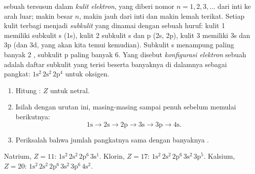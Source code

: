 \begin{definition}\label{def:g10:electron-shells:configuration}
 sebuah  tersusun dalam
\emph{kulit elektron}, yang diberi nomor
$n = 1, 2, 3, \ldots$ dari inti ke arah luar; makin besar $n$, makin
jauh dari inti dan makin lemah  terikat. Setiap kulit
terbagi menjadi \emph{subkulit} yang dinamai dengan
sebuah huruf: kulit 1 memiliki subkulit s (1s), kulit 2 subkulit s dan
p (2s, 2p), kulit 3 memiliki 3s dan 3p (dan 3d, yang akan kita temui
kemudian). Subkulit s menampung paling banyak 2 , subkulit p
paling banyak 6. Yang disebut
\emph{konfigurasi elektron} sebuah 
adalah daftar subkulit yang terisi beserta banyaknya  di
dalamnya sebagai pangkat: $1\mathrm{s}^2\,2\mathrm{s}^2\,2\mathrm{p}^4$
untuk oksigen.
\end{definition}

\begin{method}[Menuliskan konfigurasi elektron, sampai $Z = 20$]\label{met:g10:electron-shells:write}
\begin{enumerate}
  \item Hitung : $Z$ untuk  netral.
  \item Isilah  dengan urutan ini, masing-masing sampai
        penuh sebelum memulai  berikutnya:
        \[
          1\mathrm{s} \to 2\mathrm{s} \to 2\mathrm{p} \to 3\mathrm{s} \to
          3\mathrm{p} \to 4\mathrm{s}.
        \]
  \item Periksalah bahwa jumlah pangkatnya sama dengan banyaknya .
\end{enumerate}
Natrium, $Z = 11$: $1\mathrm{s}^2\,2\mathrm{s}^2\,2\mathrm{p}^6\,3\mathrm{s}^1$.
Klorin, $Z = 17$: $1\mathrm{s}^2\,2\mathrm{s}^2\,2\mathrm{p}^6\,3\mathrm{s}^2\,3\mathrm{p}^5$.
Kalsium, $Z = 20$: $1\mathrm{s}^2\,2\mathrm{s}^2\,2\mathrm{p}^6\,3\mathrm{s}^2\,3\mathrm{p}^6\,4\mathrm{s}^2$.
\end{method}

